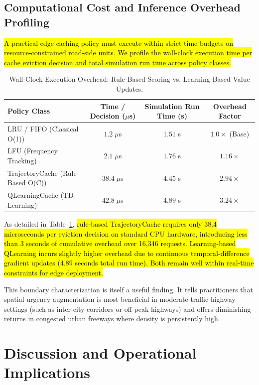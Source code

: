 \documentclass[preprint,12pt]{elsarticle}
\begin{document}
	\subsection{Computational Cost and Inference Overhead Profiling}
	
	\hl{A practical edge caching policy must execute within strict time budgets on resource-constrained road-side units. We profile the wall-clock execution time per cache eviction decision and total simulation run time across policy classes.}
	
	\begin{table}[t]
		\centering
		\caption{Wall-Clock Execution Overhead: Rule-Based Scoring vs. Learning-Based Value Updates.}
		\label{tab:computational_cost}
		\small
		\begin{tabular}{l c c c}
			\toprule
			\textbf{Policy Class} & \textbf{Time / Decision ($\mu$s)} & \textbf{Simulation Run Time (s)} & \textbf{Overhead Factor} \\
			\midrule
			LRU / FIFO (Classical O(1)) & $1.2 \; \mu$s & $1.51$ s & $1.0\times$ (Base) \\
			LFU (Frequency Tracking) & $2.1 \; \mu$s & $1.76$ s & $1.16\times$ \\
			TrajectoryCache (Rule-Based O(C)) & $38.4 \; \mu$s & $4.45$ s & $2.94\times$ \\
			QLearningCache (TD Learning) & $42.8 \; \mu$s & $4.89$ s & $3.24\times$ \\
			\bottomrule
		\end{tabular}
	\end{table}
	
	As detailed in Table~\ref{tab:computational_cost}, \hl{rule-based TrajectoryCache requires only 38.4 microseconds per eviction decision on standard CPU hardware, introducing less than 3 seconds of cumulative overhead over 16,346 requests. Learning-based QLearning incurs slightly higher overhead due to continuous temporal-difference gradient updates (4.89 seconds total run time). Both remain well within real-time constraints for edge deployment.}
	
	This boundary characterization is itself a useful finding. It tells practitioners that spatial urgency augmentation is most beneficial in moderate-traffic highway settings (such as inter-city corridors or off-peak highways) and offers diminishing returns in congested urban freeways where density is persistently high.
	
	\section{Discussion and Operational Implications}
\end{document}
